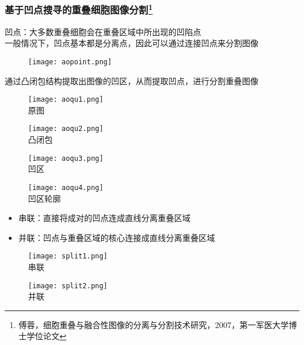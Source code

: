 \documentclass[notheorems,mathserif,table,compress]{beamer}  %
\begin{document}
\begin{frame}
  \frametitle{基于凹点搜寻的重叠细胞图像分割\footnote{傅蓉，细胞重叠与融合性图像的分离与分割技术研究，2007，第一军医大学博士学位论文}}
   凹点：大多数重叠细胞会在重叠区域中所出现的凹陷点\\
   一般情况下，凹点基本都是分离点，因此可以通过连接凹点来分割图像\\
   \begin{figure}[!ht]
   \centering
   \texttt{[image: aopoint.png]}
   \end{figure}
\end{frame} 



\begin{frame}
    通过凸闭包结构提取出图像的凹区，从而提取凹点，进行分割重叠图像
      \begin{figure}
   \begin{minipage}[t]{0.4\textwidth} 
     \centering 
     \texttt{[image: aoqu1.png]} \\
     原图
   \end{minipage}
   \begin{minipage}[t]{0.4\textwidth} 
     \centering 
     \texttt{[image: aoqu2.png]} \\
     凸闭包
   \end{minipage}
   \begin{minipage}[b]{0.4\textwidth} 
     \centering 
     \texttt{[image: aoqu3.png]} \\
     凹区
   \end{minipage}
   \begin{minipage}[b]{0.4\textwidth} 
     \centering 
     \texttt{[image: aoqu4.png]} \\
     凹区轮廓
   \end{minipage}
   \end{figure}
\end{frame}
 


\begin{frame}
  \begin{itemize}
   \item 串联：直接将成对的凹点连成直线分离重叠区域
   \item 并联：凹点与重叠区域的核心连接成直线分离重叠区域
   \end{itemize}
  \begin{figure}
   \begin{minipage}[t]{0.5\textwidth} 
     \centering 
     \texttt{[image: split1.png]} \\
      串联
   \end{minipage}
   \begin{minipage}[t]{0.5\textwidth} 
     \centering 
     \texttt{[image: split2.png]} \\
      并联
   \end{minipage}
   \end{figure}
\end{frame}
\end{document}
